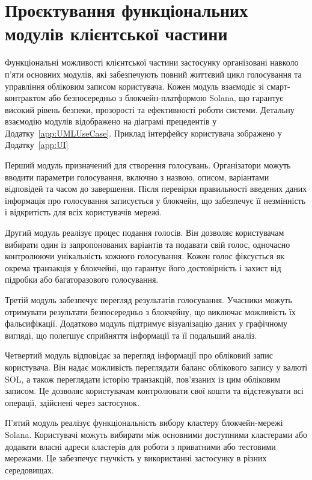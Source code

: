 \documentclass[14pt]{extreport}
\begin{document}
  \section{Проєктування функціональних модулів клієнтської частини}
  
  Функціональні можливості клієнтської частини застосунку організовані навколо п'яти основних модулів, які забезпечують повний життєвий цикл голосування та управління обліковим записом користувача. Кожен модуль взаємодіє зі смарт-контрактом або безпосередньо з блокчейн-платформою Solana, що гарантує високий рівень безпеки, прозорості та ефективності роботи системи. Детальну взаємодію модулів відображено на діаграмі прецедентів у Додатку~\ref{app:UMLUseCase}. Приклад інтерфейсу користувача зображено у Додатку~\ref{app:UI}

  Перший модуль призначений для створення голосувань. Організатори можуть вводити параметри голосування, включно з назвою, описом, варіантами відповідей та часом до завершення. Після перевірки правильності введених даних інформація про голосування записується у блокчейн, що забезпечує її незмінність і відкритість для всіх користувачів мережі.

  Другий модуль реалізує процес подання голосів. Він дозволяє користувачам вибирати один із запропонованих варіантів та подавати свій голос, одночасно контролюючи унікальність кожного голосування. Кожен голос фіксується як окрема транзакція у блокчейні, що гарантує його достовірність і захист від підробки або багаторазового голосування.

  Третій модуль забезпечує перегляд результатів голосування. Учасники можуть отримувати результати безпосередньо з блокчейну, що виключає можливість їх фальсифікації. Додатково модуль підтримує візуалізацію даних у графічному вигляді, що полегшує сприйняття інформації та її подальший аналіз.

  Четвертий модуль відповідає за перегляд інформації про обліковий запис користувача. Він надає можливість переглядати баланс облікового запису у валюті SOL, а також переглядати історію транзакцій, пов'язаних із цим обліковим записом. Це дозволяє користувачам контролювати свої кошти та відстежувати всі операції, здійснені через застосунок.

  П'ятий модуль реалізує функціональність вибору кластеру блокчейн-мережі Solana. Користувачі можуть вибирати між основними доступними кластерами або додавати власні адреси кластерів для роботи з приватними або тестовими мережами. Це забезпечує гнучкість у використанні застосунку в різних середовищах.
  
\end{document}
